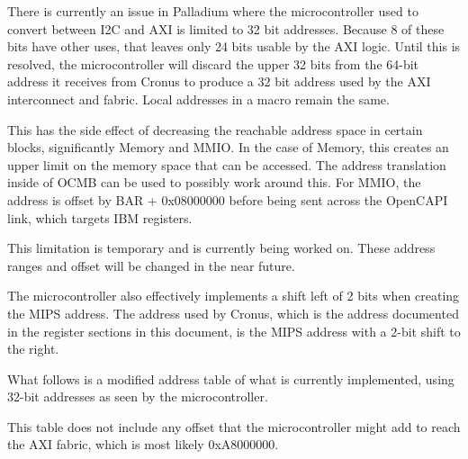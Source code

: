 \begin{emulation}
  There is currently an issue in Palladium where the microcontroller
  used to convert between I2C and AXI is limited to 32 bit
  addresses. Because 8 of these bits have other uses, that leaves only
  24 bits usable by the AXI logic. Until this is resolved, the
  microcontroller will discard the upper 32 bits from the 64-bit
  address it receives from Cronus to produce a 32 bit address used by
  the AXI interconnect and fabric. Local addresses in a macro remain
  the same.

  This has the side effect of decreasing the reachable address space
  in certain blocks, significantly Memory and MMIO. In the case of
  Memory, this creates an upper limit on the memory space that can be
  accessed. The address translation inside of OCMB can be used to
  possibly work around this. For MMIO, the address is offset by BAR +
  0x08000000 before being sent across the OpenCAPI link, which targets
  IBM registers.

  This limitation is temporary and is currently being worked on. These
  address ranges and offset will be changed in the near future.

  The microcontroller also effectively implements a shift left of 2
  bits when creating the MIPS address. The address used by Cronus,
  which is the address documented in the register sections in this
  document, is the MIPS address with a 2-bit shift to the right.

  What follows is a modified address table of what is currently
  implemented, using 32-bit addresses as seen by the microcontroller.

  This table does not include any offset that the microcontroller
  might add to reach the AXI fabric, which is most likely 0xA8000000.


\end{emulation}
